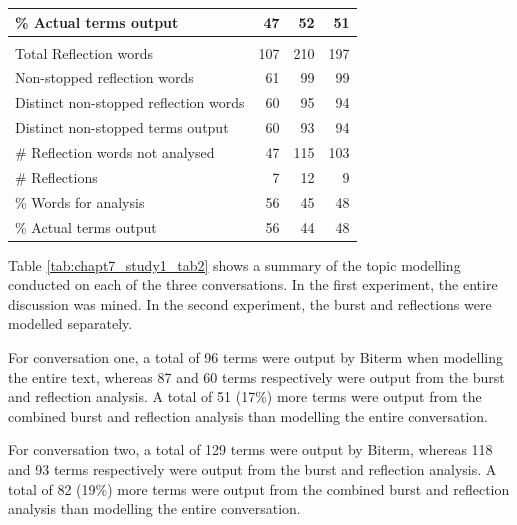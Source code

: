 \begin {table}[]
\begin{center}
\begin{tabular}{| p{6.8cm} | p{1.5cm} | p{1.5cm} | p{1.5cm} |}
\\ \hline \% Actual terms output & \multicolumn{0}{|r|}{47} & \multicolumn{0}{|r|}{52} & \multicolumn{0}{|r|}{51} 
\\ \hline & & & 
\\ \hline Total Reflection words & \multicolumn{0}{|r|}{107} & \multicolumn{0}{|r|}{210} & \multicolumn{0}{|r|}{197} 
\\ \hline Non-stopped reflection words & \multicolumn{0}{|r|}{61} & \multicolumn{0}{|r|}{99} & \multicolumn{0}{|r|}{99} 
\\ \hline Distinct non-stopped reflection words & \multicolumn{0}{|r|}{60} & \multicolumn{0}{|r|}{95} & \multicolumn{0}{|r|}{94} 
\\ \hline Distinct non-stopped terms output & \multicolumn{0}{|r|}{60} & \multicolumn{0}{|r|}{93} & \multicolumn{0}{|r|}{94} 
\\ \hline \# Reflection words not analysed & \multicolumn{0}{|r|}{47} & \multicolumn{0}{|r|}{115} & \multicolumn{0}{|r|}{103} 
\\ \hline \# Reflections & \multicolumn{0}{|r|}{7} & \multicolumn{0}{|r|}{12} & \multicolumn{0}{|r|}{9} 
\\ \hline \% Words for analysis & \multicolumn{0}{|r|}{56} & \multicolumn{0}{|r|}{45} & \multicolumn{0}{|r|}{48} 
\\ \hline \% Actual terms output & \multicolumn{0}{|r|}{56} & \multicolumn{0}{|r|}{44} & \multicolumn{0}{|r|}{48} 
\\ \hline
\end{tabular}
\end{center}
\end{table}


Table \ref{tab:chapt7_study1_tab2} shows a summary of the topic modelling conducted on each of the three conversations. In the first experiment, the entire discussion was mined. In the second experiment, the burst and reflections were modelled separately. 

For conversation one, a total of 96 terms were output by Biterm when modelling the entire text, whereas 87 and 60 terms respectively were output from the burst and reflection analysis. A total of 51 (17\%) more terms were output from the combined burst and reflection analysis than modelling the entire conversation.

For conversation two, a total of 129 terms were output by Biterm, whereas 118 and 93 terms respectively were output from the burst and reflection analysis. A total of 82 (19\%) more terms were output from the combined burst and reflection analysis than modelling the entire conversation.

